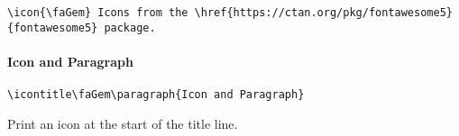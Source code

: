 \documentclass[itdr]{subfiles}
\begin{document}
\begin{lstlisting}
\icon{\faGem} Icons from the \href{https://ctan.org/pkg/fontawesome5}{fontawesome5} package.
\end{lstlisting}

\skipline

\icontitle\faGem\paragraph{Icon and Paragraph}

\begin{lstlisting}
\icontitle\faGem\paragraph{Icon and Paragraph}
\end{lstlisting}

Print an icon at the start of the title line.

\skipline
\end{document}
